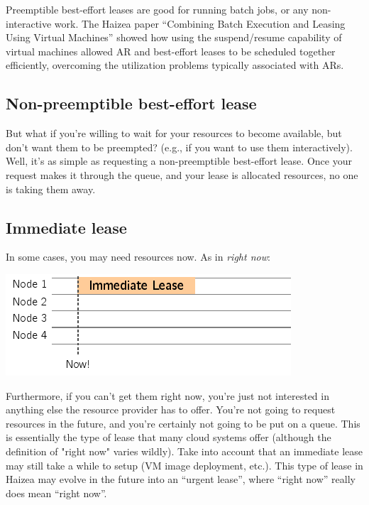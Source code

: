 Preemptible best-effort leases are good for running batch jobs, or any non-interactive work. The Haizea paper ``Combining Batch Execution and Leasing Using Virtual Machines'' showed how using the suspend/resume capability of virtual machines allowed AR and best-effort leases to be scheduled together efficiently, overcoming the utilization problems typically associated with ARs.

\subsection{Non-preemptible best-effort lease}

But what if you're willing to wait for your resources to become available, but don't want them to be preempted? (e.g., if you want to use them interactively). Well, it's as simple as requesting a non-preemptible best-effort lease. Once your request makes it through the queue, and your lease is allocated resources, no one is taking them away.

\subsection{Immediate lease}

In some cases, you may need resources now. As in \emph{right now}:

\begin{center}
\includegraphics{images/lease_im.png}
\end{center}


Furthermore, if you can't get them right now, you're just not interested in anything else the resource provider has to offer. You're not going to request resources in the future, and you're certainly not going to be put on a queue. This is essentially the type of lease that many cloud systems offer (although the definition of "right now" varies wildly). Take into account that an immediate lease may still take a while to setup (VM image deployment, etc.). This type of lease in Haizea may evolve in the future into an ``urgent lease'', where ``right now'' really does mean ``right now''.


